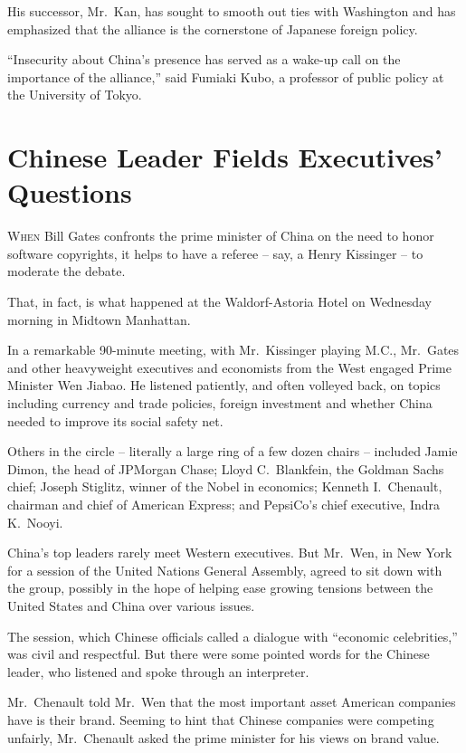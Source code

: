 ﻿\documentclass[12pt]{article}
\begin{document}
His successor, Mr.~Kan, has sought to smooth out ties with Washington and has emphasized that the
alliance is the cornerstone of Japanese foreign policy.

``Insecurity about China's presence has served as a wake-up call on the importance of the
alliance,'' said Fumiaki Kubo, a professor of public policy at the University of Tokyo.

\pagebreak
\section{Chinese Leader Fields Executives' Questions}

\lettrine{W}{hen} Bill Gates confronts the prime minister of China on the
need to honor software copyrights, it helps to have a referee -- say, a Henry Kissinger -- to
moderate the debate.

That, in fact, is what happened at the Waldorf-Astoria Hotel on Wednesday morning in Midtown
Manhattan.

In a remarkable 90-minute meeting, with Mr.~Kissinger playing M.C., Mr.~Gates and other heavyweight
executives and economists from the West engaged Prime Minister Wen Jiabao. He listened patiently,
and often volleyed back, on topics including currency and trade policies, foreign investment and
whether China needed to improve its social safety net.

Others in the circle -- literally a large ring of a few dozen chairs -- included Jamie Dimon, the
head of JPMorgan Chase; Lloyd C.~Blankfein, the Goldman Sachs chief; Joseph Stiglitz, winner of the
Nobel in economics; Kenneth I.~Chenault, chairman and chief of American Express; and PepsiCo's chief
executive, Indra K.~Nooyi.

China's top leaders rarely meet Western executives. But Mr.~Wen, in New York for a session of the
United Nations General Assembly, agreed to sit down with the group, possibly in the hope of helping
ease growing tensions between the United States and China over various issues.

The session, which Chinese officials called a dialogue with ``economic celebrities,'' was civil and
respectful. But there were some pointed words for the Chinese leader, who listened and spoke through
an interpreter.

Mr.~Chenault told Mr.~Wen that the most important asset American companies have is their brand.
Seeming to hint that Chinese companies were competing unfairly, Mr.~Chenault asked the prime
minister for his views on brand value.
\end{document}
